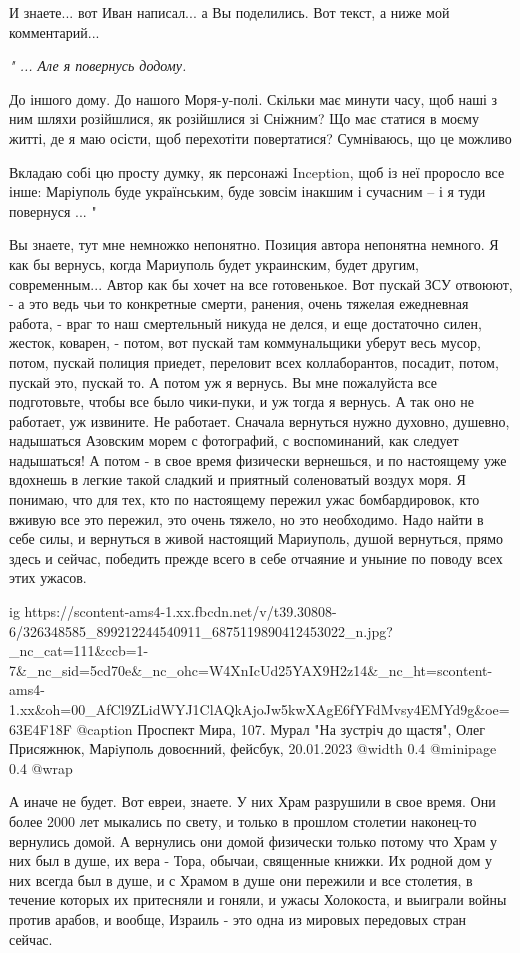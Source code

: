 И знаете... вот Иван написал... а Вы поделились. Вот текст, а ниже мой комментарий...

\begingroup
\em
"
...
Але я повернусь додому.

До іншого дому. До нашого Моря-у-полі. Скільки має минути часу, щоб наші з ним
шляхи розійшлися, як розійшлися зі Сніжним? Що має статися в моєму житті, де я
маю осісти, щоб перехотіти повертатися? Сумніваюсь, що це можливо

Вкладаю собі цю просту думку, як персонажі Inception, щоб із неї проросло все
інше: Маріуполь буде українським, буде зовсім інакшим і сучасним – і я туди
повернуся
...
"
\endgroup

Вы знаете, тут мне немножко непонятно. Позиция автора непонятна немного. Я как
бы вернусь, когда Мариуполь будет украинским, будет другим, современным...
Автор как бы хочет на все готовенькое. Вот пускай ЗСУ отвоюют, - а это ведь чьи
то конкретные смерти, ранения, очень тяжелая ежедневная работа, - враг то наш
смертельный никуда не делся, и еще достаточно силен, жесток, коварен, - потом,
вот пускай там коммунальщики уберут весь мусор, потом, пускай полиция приедет,
переловит всех коллаборантов, посадит, потом, пускай это, пускай то. А потом уж
я вернусь. Вы мне пожалуйста все подготовьте, чтобы все было чики-пуки, и уж
тогда я вернусь. А так оно не работает, уж извините. Не работает. Сначала
вернуться нужно духовно, душевно, надышаться Азовским морем с фотографий, с
воспоминаний, как следует надышаться!  А потом - в свое время физически
вернешься, и по настоящему уже вдохнешь в легкие такой сладкий и приятный
соленоватый воздух моря. Я понимаю, что для тех, кто по настоящему пережил ужас
бомбардировок, кто вживую все это пережил, это очень тяжело, но это необходимо.
Надо найти в себе силы, и вернуться в живой настоящий Мариуполь, душой
вернуться, прямо здесь и сейчас, победить прежде всего в себе отчаяние и уныние
по поводу всех этих ужасов.

\ifcmt
  ig https://scontent-ams4-1.xx.fbcdn.net/v/t39.30808-6/326348585_899212244540911_6875119890412453022_n.jpg?_nc_cat=111&ccb=1-7&_nc_sid=5cd70e&_nc_ohc=W4XnIcUd25YAX9H2z14&_nc_ht=scontent-ams4-1.xx&oh=00_AfCl9ZLidWYJ1ClAQkAjoJw5kwXAgE6fYFdMvsy4EMYd9g&oe=63E4F18F
  @caption Проспект Мира, 107. Мурал "На зустріч до щастя", Олег Присяжнюк, Марiуполь довоєнний, фейсбук, 20.01.2023
  @width 0.4
  @minipage 0.4
  @wrap \parpic[r]
\fi

А иначе не будет. Вот евреи, знаете. У них
Храм разрушили в свое время. Они более 2000 лет мыкались по свету, и только в
прошлом столетии наконец-то вернулись домой. А вернулись они домой физически
только потому что Храм у них был в душе, их вера - Тора, обычаи, священные
книжки. Их родной дом у них всегда был в душе, и с Храмом в душе они пережили и
все столетия, в течение которых их притесняли и гоняли, и ужасы Холокоста, и
выиграли войны против арабов, и вообще, Израиль - это одна из мировых передовых
стран сейчас.

